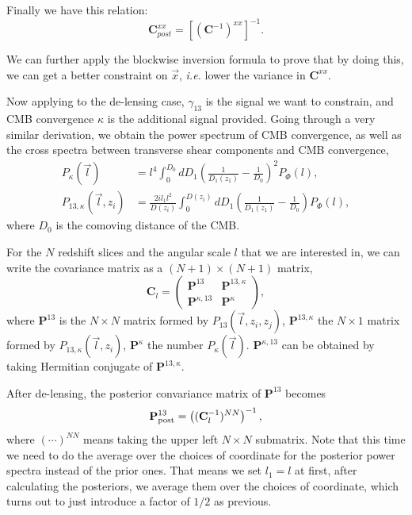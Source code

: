 \documentclass[aps,prd,twocolumn,floatfix,showpacs,superscriptaddress,nofootinbib]{revtex4-1}
\newcommand{\ie}{{\it i.e. }}
\begin{document}
Finally we have this relation:
\begin{equation}
\mathbf{C}_{post}^{xx}=\left[\left(\mathbf{C}^{-1}\right)^{xx}\right]^{-1}.
\end{equation}

We can further apply the blockwise inversion formula to prove that by doing this, we can get a better constraint on $\vec{x}$, \ie lower the variance in $\mathbf{C}^{xx}$.

Now applying to the de-lensing case, $\gamma_{13}$ is the signal we want to constrain, and CMB convergence $\kappa$ is the additional signal provided. Going through a very similar derivation, we obtain the power spectrum of CMB convergence, as well as the cross spectra between transverse shear components and CMB convergence,
\begin{align}
P_{\kappa}(\vec{l})&=l^4\int_0^{D_0}dD_1\left(\frac{1}{D_1(z_1)}-\frac{1}{D_0}\right)^2P_\Phi(l),\nonumber\\
P_{13,\kappa}(\vec{l},z_i)&=\frac{2il_1l^2}{D(z_i)}\int_0^{D(z_i)}dD_1\left(\frac{1}{D_1(z_1)}-\frac{1}{D_0}\right)P_\Phi(l),
\end{align}
where $D_0$ is the comoving distance of the CMB.

For the $N$ redshift slices and the angular scale $l$ that we are interested in, we can write the covariance matrix as a $(N+1)\times(N+1)$ matrix,
\begin{equation}
\mathbf{C}_l=\left(\begin{array}{ll}
\mathbf{P}^{13} & \mathbf{P}^{13,\kappa}\\
\mathbf{P}^{\kappa,13} & \mathbf{P}^{\kappa}
\end{array}\right),
\end{equation}
where $\mathbf{P}^{13}$ is the $N\times N$ matrix formed by $P_{13}(\vec{l},z_i,z_j)$, $\mathbf{P}^{13,\kappa}$ the $N\times 1$ matrix formed by $P_{13,\kappa}(\vec{l},z_i)$, $\mathbf{P}^{\kappa}$ the number $P_{\kappa}(\vec{l})$. $\mathbf{P}^{\kappa,13}$ can be obtained by taking Hermitian conjugate of $\mathbf{P}^{13,\kappa}$.

After de-lensing, the posterior convariance matrix of $\mathbf{P}^{13}$ becomes
\begin{equation}
\mathbf{P}_{\rm post}^{13}=\left( (\mathbf{C}_l^{-1})^{NN} \right)^{-1},
\end{equation}
where $(\cdots)^{NN}$ means taking the upper left $N\times N$ submatrix. Note that this time we need to do the average over the choices of coordinate for the posterior power spectra instead of the prior ones. That means we set $l_1=l$ at first, after calculating the posteriors, we average them over the choices of coordinate, which turns out to just introduce a factor of $1/2$ as previous.
\end{document}
